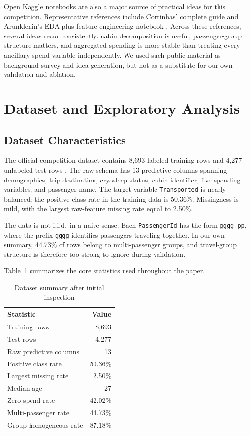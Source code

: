 \documentclass[conference]{IEEEtran}
\begin{document}
Open Kaggle notebooks are also a major source of practical ideas for this competition. Representative references include Cortinhas' complete guide and Arunklenin's EDA plus feature engineering notebook \cite{cortinhas,arunklenin}. Across these references, several ideas recur consistently: cabin decomposition is useful, passenger-group structure matters, and aggregated spending is more stable than treating every ancillary-spend variable independently. We used such public material as background survey and idea generation, but not as a substitute for our own validation and ablation.

\section{Dataset and Exploratory Analysis}
\subsection{Dataset Characteristics}
The official competition dataset contains 8,693 labeled training rows and 4,277 unlabeled test rows \cite{kaggle}. The raw schema has 13 predictive columns spanning demographics, trip destination, cryosleep status, cabin identifier, five spending variables, and passenger name. The target variable \texttt{Transported} is nearly balanced: the positive-class rate in the training data is 50.36\%. Missingness is mild, with the largest raw-feature missing rate equal to 2.50\%.

The data is not i.i.d.\ in a naive sense. Each \texttt{PassengerId} has the form \texttt{gggg\_pp}, where the prefix \texttt{gggg} identifies passengers traveling together. In our own summary, 44.73\% of rows belong to multi-passenger groups, and travel-group structure is therefore too strong to ignore during validation.

Table~\ref{tab:dataset-summary} summarizes the core statistics used throughout the paper.

\begin{table}[!t]
\caption{Dataset summary after initial inspection}
\label{tab:dataset-summary}
\centering
\begin{tabular}{lr}
\toprule
Statistic & Value \\
\midrule
Training rows & 8,693 \\
Test rows & 4,277 \\
Raw predictive columns & 13 \\
Positive class rate & 50.36\% \\
Largest missing rate & 2.50\% \\
Median age & 27 \\
Zero-spend rate & 42.02\% \\
Multi-passenger rate & 44.73\% \\
Group-homogeneous rate & 87.18\% \\
\bottomrule
\end{tabular}
\end{table}
\end{document}
